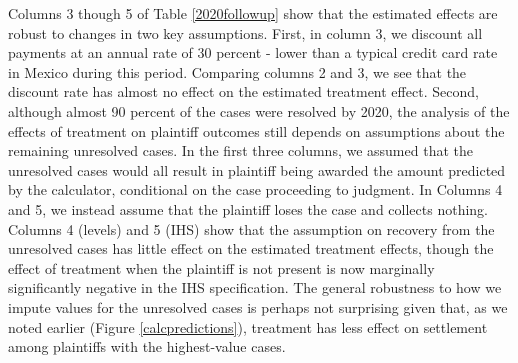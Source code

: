 \documentclass[11pt, a4paper]{article}
\begin{document}
   Columns 3 though 5 of Table \ref{2020followup} show that the estimated effects are robust to changes in two key assumptions. First, in column 3, we discount all payments at an annual rate of 30 percent - lower than a typical credit card rate in Mexico during this period. Comparing columns 2 and 3, we see that the discount rate has almost no effect on the estimated treatment effect. Second, although almost 90 percent of the cases were resolved by 2020, the analysis of the effects of treatment on plaintiff outcomes still depends on assumptions about the remaining unresolved cases. In the first three columns, we assumed that the unresolved cases would all result in plaintiff being awarded the amount predicted by the calculator, conditional on the case proceeding to judgment. In Columns 4 and 5, we instead assume that the plaintiff loses the case and collects nothing. Columns 4 (levels) and 5 (IHS) show that the assumption on recovery from the unresolved cases has little effect on the estimated treatment effects, though the effect of treatment when the plaintiff is not present is now marginally significantly negative in the IHS specification. The general robustness to how we impute values for the unresolved cases is perhaps not surprising given that, as we noted earlier (Figure \ref{calcpredictions}), treatment has less effect on settlement among plaintiffs with the highest-value cases. 
  
  
  
\end{document}
